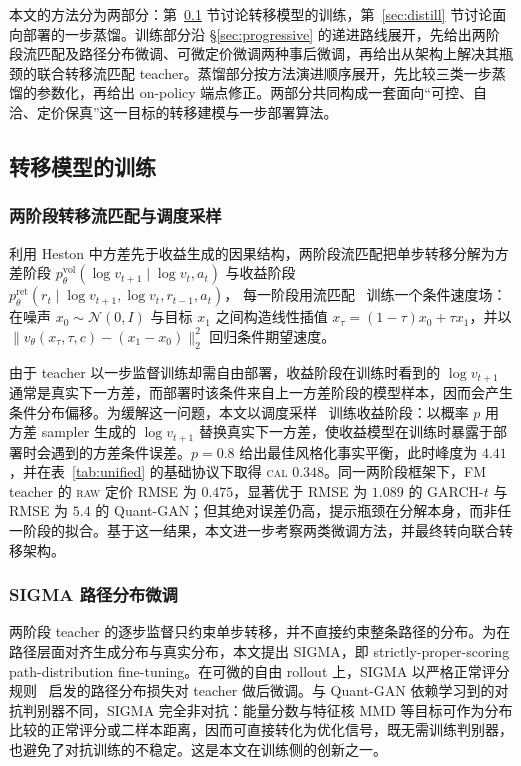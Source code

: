 \documentclass[11pt]{ctexart}
\newcommand{\raw}{\textsc{raw}}
\renewcommand{\cal}{\textsc{cal}}
\begin{document}
本文的方法分为两部分：第~\ref{sec:train} 节讨论转移模型的训练，第~\ref{sec:distill} 节讨论面向部署的一步蒸馏。训练部分沿 \S\ref{sec:progressive} 的递进路线展开，先给出两阶段流匹配及路径分布微调、可微定价微调两种事后微调，再给出从架构上解决其瓶颈的联合转移流匹配 teacher。蒸馏部分按方法演进顺序展开，先比较三类一步蒸馏的参数化，再给出 on-policy 端点修正。两部分共同构成一套面向“可控、自洽、定价保真”这一目标的转移建模与一步部署算法。

\subsection{转移模型的训练}
\label{sec:train}

\subsubsection{两阶段转移流匹配与调度采样}
\label{sec:twostage}
利用 Heston 中方差先于收益生成的因果结构，两阶段流匹配把单步转移分解为方差阶段
$p^{\mathrm{vol}}_\theta(\log v_{t+1}\mid \log v_t,a_t)$
与收益阶段
$p^{\mathrm{ret}}_\theta(r_t\mid \log v_{t+1},\log v_t,r_{t-1},a_t)$，
每一阶段用流匹配~\citep{lipman2023flow,liu2023rectified} 训练一个条件速度场：在噪声 $x_0\sim\mathcal N(0,I)$ 与目标 $x_1$ 之间构造线性插值 $x_\tau=(1-\tau)x_0+\tau x_1$，并以 $\|v_\theta(x_\tau,\tau,c)-(x_1-x_0)\|_2^2$ 回归条件期望速度。

由于 teacher 以一步监督训练却需自由部署，收益阶段在训练时看到的 $\log v_{t+1}$ 通常是真实下一方差，而部署时该条件来自上一方差阶段的模型样本，因而会产生条件分布偏移。为缓解这一问题，本文以调度采样~\citep{bengio2015scheduled} 训练收益阶段：以概率 $p$ 用方差 sampler 生成的 $\log v_{t+1}$ 替换真实下一方差，使收益模型在训练时暴露于部署时会遇到的方差条件误差。$p=0.8$ 给出最佳风格化事实平衡，此时峰度为 $4.41$，并在表~\ref{tab:unified} 的基础协议下取得 \cal{} $0.348$。同一两阶段框架下，FM teacher 的 \raw{} 定价 RMSE 为 $0.475$，显著优于 RMSE 为 $1.089$ 的 GARCH-$t$ 与 RMSE 为 $5.4$ 的 Quant-GAN；但其绝对误差仍高，提示瓶颈在分解本身，而非任一阶段的拟合。基于这一结果，本文进一步考察两类微调方法，并最终转向联合转移架构。

\subsubsection{SIGMA 路径分布微调}
\label{sec:sigma}
两阶段 teacher 的逐步监督只约束单步转移，并不直接约束整条路径的分布。为在路径层面对齐生成分布与真实分布，本文提出 SIGMA，即 strictly-proper-scoring path-distribution fine-tuning。在可微的自由 rollout 上，SIGMA 以严格正常评分规则~\citep{gneiting2007strictly} 启发的路径分布损失对 teacher 做后微调。与 Quant-GAN 依赖学习到的对抗判别器不同，SIGMA 完全非对抗：能量分数与特征核 MMD 等目标可作为分布比较的正常评分或二样本距离，因而可直接转化为优化信号，既无需训练判别器，也避免了对抗训练的不稳定。这是本文在训练侧的创新之一。
\end{document}
